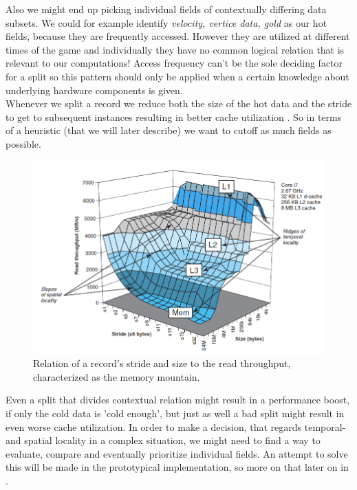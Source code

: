 Also we might end up picking individual fields of contextually differing data subsets. We could for example identify \textit{velocity, vertice data, gold} as our hot fields, because they are frequently accessed. However they are utilized at different times of the game and individually they have no common logical relation that is relevant to our computations! Access frequency can't be the sole deciding factor for a split so this pattern should only be applied when a certain knowledge about underlying hardware components is given.\\
Whenever we split a record we reduce both the size of the hot data and the stride to get to subsequent instances resulting in better cache utilization . So in terms of a heuristic (that we will later describe) we want to cutoff as much fields as possible.
\begin{figure}[!htbp]
	\centering
	\includegraphics[width=\textwidth, height=0.5\textwidth]{PICs/memory_mountain}
	\caption{Relation of a record's stride and size to the read throughput, characterized as the memory mountain. }\label{memory_mountain}
\end{figure}
Even a split that divides contextual relation might result in a performance boost, if only the cold data is 'cold enough', but just as well a bad split might result in even worse cache utilization.
In order to make a decision, that regards temporal- and spatial locality in a complex situation, we might need to find a way to evaluate, compare and eventually prioritize individual fields. An attempt to solve this will be made in the prototypical implementation, so more on that later on in .

